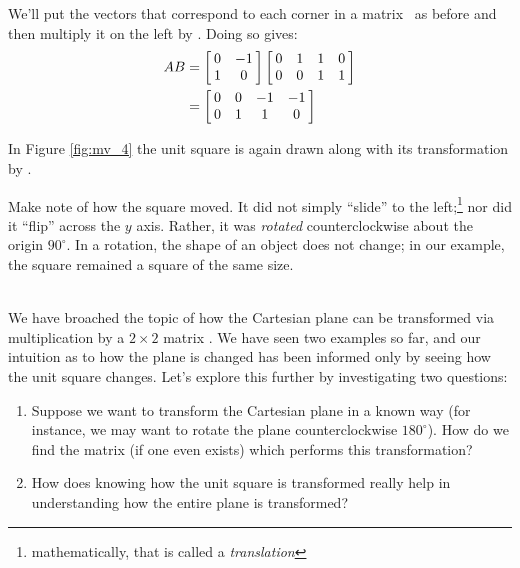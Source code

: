 {We'll put the vectors that correspond to each corner in a matrix \ttb\ as before and then multiply it on the left by \tta. Doing so gives:
\begin{align*}
\tta\ttb &= \bmx{cc}0&-1\\1&0\emx \bmx{cccc}0&1&1&0\\0&0&1&1\emx\\
				& = \bmx{cccc}0 & 0&-1&-1\\0&1&1&0\emx
\end{align*}

In Figure \ref{fig:mv_4} the unit square is again drawn along with its transformation by \tta.

\begin{myfigure}
\begin{center}
\end{center}
\label{fig:mv_4}
\end{myfigure}

Make note of how the square moved. It did not simply ``slide'' to the left;\footnote{mathematically, that is called a \textit{translation}} nor did it ``flip'' across the $y$ axis. Rather, it was \textit{rotated} counterclockwise about the origin $90^\circ$. In a rotation, the shape of an object does not change; in our example, the square remained a square of the same size.
}\\

We have broached the topic of how the Cartesian plane can be transformed via multiplication by a $2\times 2$ matrix \tta. We have seen two examples so far, and our intuition as to how the plane is changed has been informed only by seeing how the unit square changes. Let's explore this further by investigating two questions:
	\begin{enumerate}
	\item		Suppose we want to transform the Cartesian plane in a known way (for instance, we may want to rotate the plane counterclockwise $180^\circ$). How do we find the matrix (if one even exists) which performs this transformation? 
	\item		How does knowing how the unit square is transformed really help in understanding how the entire plane is transformed?
	\end{enumerate}

